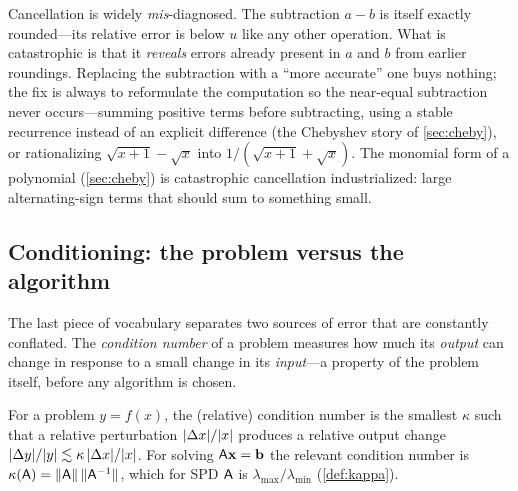 \begin{pitfall}
Cancellation is widely \emph{mis}-diagnosed. The subtraction $a-b$ is itself
exactly rounded---its relative error is below $u$ like any other operation. What is
catastrophic is that it \emph{reveals} errors already present in $a$ and $b$ from
earlier roundings. Replacing the subtraction with a ``more accurate'' one buys
nothing; the fix is always to reformulate the computation so the near-equal
subtraction never occurs---summing positive terms before subtracting, using a
stable recurrence instead of an explicit difference (the Chebyshev story of
\cref{sec:cheby}), or rationalizing $\sqrt{x+1}-\sqrt{x}$ into
$1/(\sqrt{x+1}+\sqrt{x})$. The monomial form of a polynomial
(\cref{sec:cheby}) is catastrophic cancellation industrialized: large
alternating-sign terms that should sum to something small.
\end{pitfall}

\subsection{Conditioning: the problem versus the algorithm}
\label{sec:conditioning}

The last piece of vocabulary separates two sources of error that are constantly
conflated. The \emph{condition number} of a problem measures how much its
\emph{output} can change in response to a small change in its \emph{input}---a
property of the problem itself, before any algorithm is chosen.

\begin{definition}
\label{def:cond}
For a problem $y = f(x)$, the (relative) condition number is the smallest $\kappa$
such that a relative perturbation $\lvert\Delta x\rvert/\lvert x\rvert$ produces a relative
output change $\lvert\Delta y\rvert/\lvert y\rvert \lesssim \kappa\,\lvert\Delta x\rvert/\lvert x\rvert$. For
solving $\mathsf{A}\mathbf{x} = \mathbf{b}$ the relevant condition number is
$\kappa(\mathsf{A}) = \lVert\mathsf{A}\rVert\,\lVert\mathsf{A}^{-1}\rVert$, which for SPD $\mathsf{A}$ is
$\lambda_{\max}/\lambda_{\min}$ (\cref{def:kappa}).
\end{definition}

